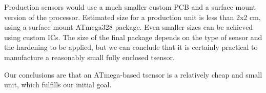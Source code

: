 Production sensors would use a much smaller custom PCB and a surface mount version of the processor. Estimated size for a production unit is less than 2x2 cm, using a surface mount ATmega328 package. Even smaller sizes can be achieved using custom ICs. The size of the final package depends on the type of sensor and the hardening to be applied, but we can conclude that it is certainly practical to manufacture a reasonably small fully enclosed tsensor. 

Our conclusions are that an ATmega-based tsensor is a relatively cheap and small unit, which fulfills our initial goal.

